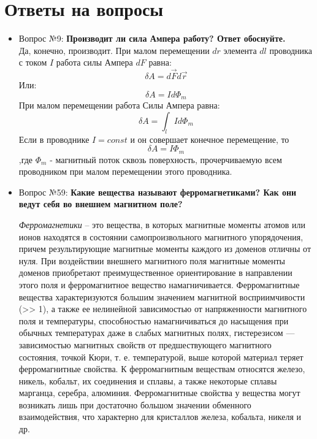\documentclass[a4paper,12pt]{report}
\begin{document}
\section*{Ответы на вопросы}

\begin{itemize}
    \item Вопрос №9: \textbf{Производит ли сила Ампера работу? Ответ обоснуйте.}\\
    Да, конечно, производит. При малом перемещении $dr$ элемента $dl$ проводника с током $I$ работа силы Ампера $dF$ равна:
    \[\delta A = d\vec{F}d\vec{r} \]
    Или:
    \[ \delta A = Id\Phi_m \]
    При малом перемещении работа Силы Ампера равна:
    \[ \delta A = \int_l Id\Phi_m \]
    Если в проводнике $I = const$ и он совершает конечное перемещение, то 
    \[ \delta A = I\Phi_m \]
    ,где $\Phi_m$ - магнитный поток сквозь поверхность, прочерчиваемую всем проводником при малом перемещении этого проводника.
    \item Вопрос №59: \textbf{Какие вещества называют ферромагнетиками? Как они ведут себя во внешнем магнитном
    поле?}
    \par
    \textit{Ферромагнетики} – это вещества, в которых магнитные моменты атомов или ионов находятся в состоянии самопроизвольного магнитного упорядочения, 
    причем результирующие магнитные моменты каждого из доменов отличны от нуля. 
    При воздействии внешнего магнитного поля магнитные моменты доменов приобретают преимущественное ориентирование в направлении этого поля и 
    ферромагнитное вещество намагничивается. Ферромагнитные вещества характеризуются большим значением магнитной восприимчивости (>> 1), 
    а также ее нелинейной зависимостью от напряженности магнитного поля и температуры, способностью намагничиваться до насыщения при обычных температурах даже в слабых магнитных полях, гистерезисом — зависимостью магнитных свойств от предшествующего магнитного состояния, точкой Кюри, т. е. температурой, выше которой материал теряет ферромагнитные свойства. К ферромагнитным веществам относятся железо, никель, кобальт, их соединения и сплавы, а также некоторые сплавы марганца, серебра, алюминия. Ферромагнитные свойства у вещества могут возникать лишь при достаточно большом значении обменного взаимодействия, что характерно для кристаллов железа, кобальта, никеля и др.
\end{itemize}
\end{document}
